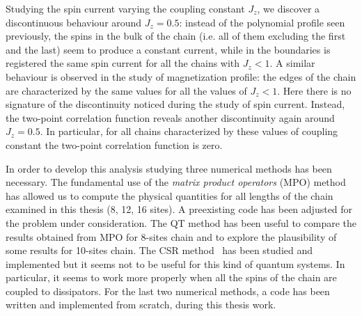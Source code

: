 \documentclass[12pt]{extarticle}
\begin{document}
Studying the spin current varying the coupling constant $J_z$, we discover a discontinuous behaviour around $J_z = 0.5$: instead of the polynomial profile seen previously, %
the spins in the bulk of the chain (i.e. all of them excluding the first and the last) seem to produce a constant current, while in the boundaries is registered the same spin current for all the chains with $J_z < 1$. A similar behaviour is observed in the study of magnetization profile: the edges of the chain are characterized by the same values for all the values of $J_z < 1$. Here there is no signature of the discontinuity noticed during the study of spin current. Instead, the two-point correlation function reveals another discontinuity again around $J_z = 0.5$. In particular, for all chains characterized by these values of coupling constant the two-point correlation function is zero.

In order to develop this analysis studying three numerical methods has been necessary. The fundamental use of the \emph{matrix product operators} (MPO) method\cite{mpo_method} has allowed us to compute the physical quantities for all lengths of the chain examined in this thesis (8, 12, 16 sites). A preexisting code has been adjusted for the problem under consideration. The QT method\cite{QT_method} has been useful to compare the results obtained from MPO for 8-sites chain and to explore the plausibility of some results for 10-sites chain. The CSR method~\cite{CSR_method} has been studied and implemented but it seems not to be useful for this kind of quantum systems. In particular, it seems to work more properly when all the spins of the chain are coupled to dissipators. For the last two numerical methods, a code has been written and implemented from scratch, during this thesis work.







\end{document}
